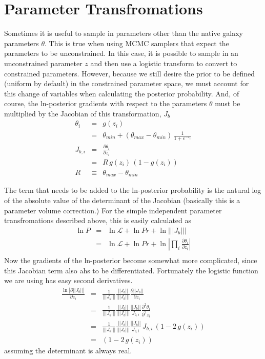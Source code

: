 \documentclass[modern]{aastex62}
\renewcommand{\det}[1]{||{#1}||}
\newcommand{\abs}[1]{|{#1}|}
\newcommand{\like}{\mathcal{L}}
\begin{document}
{\section{Parameter Transfromations}
Sometimes it is useful to sample in parameters other than the native galaxy parameters $\theta$.
This is true when using MCMC samplers that expect the parameters to be unconstrained.
In this case, it is possible to sample in an unconstrained parameter $z$ and then use a logistic transform to convert to constrained parameters.
However, because we still desire the prior to be defined (uniform by default) in the constrained parameter space, we must account for this change of variables when calculating the posterior probability.
And, of course, the ln-posterior gradients with respect to the parameters $\theta$ must be multiplied by the Jacobian of this transformation, $J_b$
\begin{eqnarray}
  \theta_i & = & g(z_i) \\
         & = & \theta_{min} + (\theta_{max} - \theta_{min}) \, \frac{1}{1 + e^{-z_i}} \\
  J_{b,i} & = & \frac{\partial \theta_i}{\partial z_i} \\
           &  = &  R \, g(z_i) \, (1 - g(z_i)) \\
     R & \equiv & \theta_{max} - \theta_{min}
\end{eqnarray}

The term that needs to be added to the ln-posterior probability is the natural log of the absolute value of the determinant of the Jacobian
(basically this is a parameter volume correction.)
For the simple independent parameter transfromations described above, this is easily calculated as
\begin{eqnarray}
   \ln P   & = & \ln \like + \ln Pr + \ln\abs{\det{J_b}} \\
 & = & \ln \like + \ln Pr + \ln \abs{ \prod_i \frac{\partial \theta_i}{\partial z_i} } \\
 \end{eqnarray}
Now the gradients of the ln-posterior become somewhat more complicated, since this Jacobian term also ahs to be differentiated.
Fortunately the logistic function we are using has easy second derivatives.
\begin{eqnarray}
  \frac{\ln \abs{\partial \det{J_b}}}{\partial z_i} & = & \frac{1}{\abs{\det{J_b}}} \frac{\det{J_b}}{\abs{\det{J_b}}} \frac{\partial \det{J_b}}{\partial z_i} \\
   & = &  \frac{1}{\abs{\det{J_b}}} \frac{\det{J_b}}{\abs{\det{J_b}}}  \frac{\det{J_b}}{J_{b,i}} \frac{\partial^2\theta_i}{\partial^2 z_i} \\
   & = & \frac{1}{\abs{\det{J_b}}} \frac{\det{J_b}}{\abs{\det{J_b}}}  \frac{\det{J_b}}{J_{b,i}} \, J_{b,i} \, (1 - 2 \, g(z_i)) \\
   & = & (1 - 2 \, g(z_i))
\end{eqnarray}
assuming the determinant is always real.


}
\end{document}
